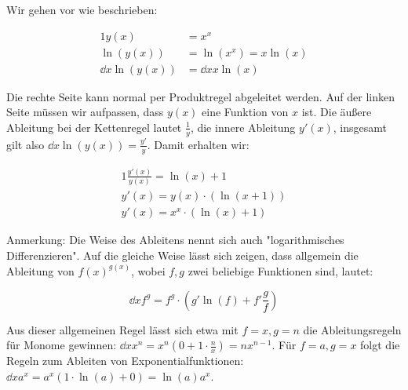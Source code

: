 \item Wir gehen vor wie beschrieben:

\begin{alignat*}{1}
	y(x) &= x^x \\
	\ln(y(x)) &= \ln(x^x) = x\ln(x) \\
	\dd{}{x} \ln(y(x)) &= \dd{}{x} x\ln(x)
\end{alignat*}

Die rechte Seite kann normal per Produktregel abgeleitet werden. Auf der linken Seite müssen wir aufpassen, dass $y(x)$ eine Funktion von $x$ ist. Die äußere Ableitung bei der Kettenregel lautet $\frac{1}{y}$, die innere Ableitung $y'(x)$, insgesamt gilt also $\dd{}{x} \ln(y(x)) = \frac{y'}{y}$. Damit erhalten wir:

\begin{alignat*}{1}
	\frac{y'(x)}{y(x)} = \ln(x)+1 \\
	y'(x) = y(x)\cdot(\ln(x+1)) \\
	y'(x) = x^x \cdot (\ln(x)+1)
\end{alignat*}

Anmerkung: Die Weise des Ableitens nennt sich auch "logarithmisches Differenzieren". Auf die gleiche Weise lässt sich zeigen, dass allgemein die Ableitung von $f(x)^{g(x)}$, wobei $f,g$ zwei beliebige Funktionen sind, lautet:

$$
	\dd{}{x} f^g = f^g \cdot \left( g'\ln(f) + f' \frac{g}{f} \right)
$$

Aus dieser allgemeinen Regel lässt sich etwa mit $f=x, g=n$ die Ableitungsregeln für Monome gewinnen: $\dd{}{x}x^n = x^n(0+1\cdot\frac{n}{x}) = nx^{n-1}$. Für $f=a, g=x$ folgt die Regeln zum Ableiten von Exponentialfunktionen: $\dd{}{x} a^x = a^x (1\cdot\ln(a) + 0) = \ln(a)a^x$.